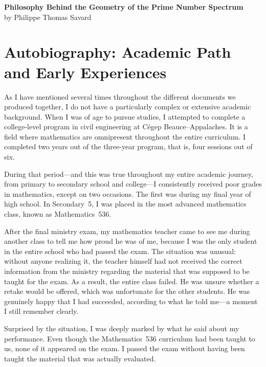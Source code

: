 \documentclass[12pt,oneside]{article}
\begin{document}
\begin{center}
{\Huge \textbf{Philosophy Behind the Geometry of the Prime Number Spectrum}}\\[1em]
{\Large by Philippe Thomas Savard}\\[2em]
\end{center}

\tableofcontents
\newpage

\section{Autobiography: Academic Path and Early Experiences}

As I have mentioned several times throughout the different documents we produced together, I do not have a particularly complex or extensive academic background. When I was of age to pursue studies, I attempted to complete a college-level program in civil engineering at Cégep Beauce–Appalaches. It is a field where mathematics are omnipresent throughout the entire curriculum. I completed two years out of the three-year program, that is, four sessions out of six.

During that period—and this was true throughout my entire academic journey, from primary to secondary school and college—I consistently received poor grades in mathematics, except on two occasions. The first was during my final year of high school. In Secondary~5, I was placed in the most advanced mathematics class, known as Mathematics~536.

After the final ministry exam, my mathematics teacher came to see me during another class to tell me how proud he was of me, because I was the only student in the entire school who had passed the exam. The situation was unusual: without anyone realizing it, the teacher himself had not received the correct information from the ministry regarding the material that was supposed to be taught for the exam. As a result, the entire class failed. He was unsure whether a retake would be offered, which was unfortunate for the other students. He was genuinely happy that I had succeeded, according to what he told me—a moment I still remember clearly.

Surprised by the situation, I was deeply marked by what he said about my performance. Even though the Mathematics~536 curriculum had been taught to us, none of it appeared on the exam. I passed the exam without having been taught the material that was actually evaluated.
\end{document}
